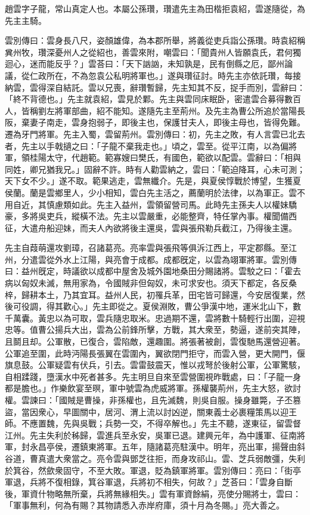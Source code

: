
\begin{pinyinscope}
趙雲字子龍，常山真定人也。本屬公孫瓚，瓚遣先主為田楷拒袁紹，雲遂隨從，為先主主騎。

雲別傳曰：雲身長八尺，姿顏雄偉，為本郡所舉，將義從吏兵詣公孫瓚。時袁紹稱兾州牧，瓚深憂州人之從紹也，善雲來附，嘲雲曰：「聞貴州人皆願袁氏，君何獨迴心，迷而能反乎？」雲荅曰：「天下訩訩，未知孰是，民有倒縣之厄，鄙州論議，從仁政所在，不為忽袁公私明將軍也。」遂與瓚征討。時先主亦依託瓚，每接納雲，雲得深自結託。雲以兄喪，辭瓚暫歸，先主知其不反，捉手而別，雲辭曰：「終不背德也。」先主就袁紹，雲見於鄴。先主與雲同床眠卧，密遣雲合募得數百人，皆稱劉左將軍部曲，紹不能知。遂隨先主至荊州。及先主為曹公所追於當陽長阪，棄妻子南走，雲身抱弱子，即後主也，保護甘夫人，即後主母也，皆得免難。遷為牙門將軍。先主入蜀，雲留荊州。雲別傳曰：初，先主之敗，有人言雲已北去者，先主以手戟擿之曰：「子龍不棄我走也。」頃之，雲至。從平江南，以為偏將軍，領桂陽太守，代趙範。範寡嫂曰樊氏，有國色，範欲以配雲。雲辭曰：「相與同姓，卿兄猶我兄。」固辭不許。時有人勸雲納之，雲曰：「範迫降耳，心未可測；天下女不少。」遂不取。範果逃走，雲無纖介。先是，與夏侯惇戰於博望，生獲夏侯蘭。蘭是雲鄉里人，少小相知，雲白先主活之，薦蘭明於法律，以為軍正。雲不用自近，其慎慮類如此。先主入益州，雲領留營司馬。此時先主孫夫人以權妹驕豪，多將吳吏兵，縱橫不法。先主以雲嚴重，必能整齊，特任掌內事。權聞備西征，大遣舟船迎妹，而夫人內欲將後主還吳，雲與張飛勒兵截江，乃得後主還。

先主自葭萌還攻劉璋，召諸葛亮。亮率雲與張飛等俱泝江西上，平定郡縣。至江州，分遣雲從外水上江陽，與亮會于成都。成都旣定，以雲為翊軍將軍。雲別傳曰：益州旣定，時議欲以成都中屋舍及城外園地桑田分賜諸將。雲駮之曰：「霍去病以匈奴未滅，無用家為，令國賊非但匈奴，未可求安也。須天下都定，各反桑梓，歸耕本土，乃其宜耳。益州人民，初罹兵革，田宅皆可歸還，今安居復業，然後可役調，得其歡心。」先主即從之。夏侯淵敗，曹公爭漢中地，運米北山下，數千萬囊。黃忠以為可取，雲兵隨忠取米。忠過期不還，雲將數十騎輕行出圍，迎視忠等。值曹公揚兵大出，雲為公前鋒所擊，方戰，其大衆至，勢逼，遂前突其陣，且鬬且却。公軍散，已復合，雲陷敵，還趣圍。將張著被創，雲復馳馬還營迎著。公軍追至圍，此時沔陽長張翼在雲圍內，翼欲閉門拒守，而雲入營，更大開門，偃旗息鼓。公軍疑雲有伏兵，引去。雲雷鼓震天，惟以戎弩於後射公軍，公軍驚駭，自相蹂踐，墮漢水中死者甚多。先主明旦自來至雲營圍視昨戰處，曰：「子龍一身都是膽也。」作樂飲宴至暝，軍中號雲為虎威將軍。孫權襲荊州，先主大怒，欲討權。雲諫曰：「國賊是曹操，非孫權也，且先滅魏，則吳自服。操身雖斃，子丕篡盜，當因衆心，早圖關中，居河、渭上流以討凶逆，關東義士必裹糧策馬以迎王師。不應置魏，先與吳戰；兵勢一交，不得卒解也。」先主不聽，遂東征，留雲督江州。先主失利於秭歸，雲進兵至永安，吳軍已退。建興元年，為中護軍、征南將軍，封永昌亭侯，遷鎮東將軍。五年，隨諸葛亮駐漢中。明年，亮出軍，揚聲由斜谷道，曹真遣大衆當之。亮令雲與鄧芝往拒，而身攻祁山。雲、芝兵弱敵彊，失利於箕谷，然歛衆固守，不至大敗。軍退，貶為鎮軍將軍。雲別傳曰：亮曰：「街亭軍退，兵將不復相錄，箕谷軍退，兵將初不相失，何故？」芝荅曰：「雲身自斷後，軍資什物略無所棄，兵將無緣相失。」雲有軍資餘絹，亮使分賜將士，雲曰：「軍事無利，何為有賜？其物請悉入赤岸府庫，須十月為冬賜。」亮大善之。


\end{pinyinscope}
